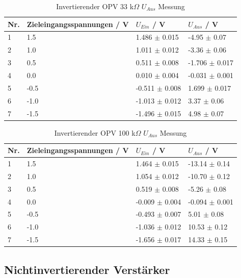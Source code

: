 \documentclass[12pt,a4paper,twoside]{article}
\begin{document}
\begin{table}[H]
    \centering
    \caption{Invertierender OPV 33 k$\Omega$ $U_{Aus}$ Messung}
    \label{tab:IoVerstärkungenGemessen33}
    \begin{tabular}{| l | l | l | l |}
        \hline
        Nr. & Zieleingangsspannungen / V & $U_{Ein}$ / V & $U_{Aus}$ / V \\
        \hline
        1 &  1.5 &  1.486 $\pm$ 0.015 & -4.95  $\pm$  0.07 \\
        2 &  1.0 &  1.011 $\pm$ 0.012 & -3.36  $\pm$  0.06 \\
        3 &  0.5 &  0.511 $\pm$ 0.008 & -1.706 $\pm$ 0.017 \\
        4 &  0.0 &  0.010 $\pm$ 0.004 & -0.031 $\pm$ 0.001 \\
        5 & -0.5 & -0.511 $\pm$ 0.008 &  1.699 $\pm$ 0.017 \\
        6 & -1.0 & -1.013 $\pm$ 0.012 &  3.37 $\pm$ 0.06  \\
        7 & -1.5 & -1.496 $\pm$ 0.015 &  4.98 $\pm$ 0.07  \\
        \hline
    \end{tabular}
\end{table}

\begin{table}[H]
    \centering
    \caption{Invertierender OPV 100 k$\Omega$ $U_{Aus}$ Messung}
    \label{tab:IoVerstärkungenGemessen100}
    \begin{tabular}{| l | l | l | l |}
        \hline
        Nr. & Zieleingangsspannungen / V & $U_{Ein}$ / V & $U_{Aus}$ / V \\
        \hline
        1 &  1.5 &  1.464 $\pm$ 0.015 & -13.14  $\pm$ 0.14  \\
        2 &  1.0 &  1.054 $\pm$ 0.012 & -10.70  $\pm$ 0.12  \\
        3 &  0.5 &  0.519 $\pm$ 0.008 &  -5.26  $\pm$ 0.08  \\
        4 &  0.0 & -0.009 $\pm$ 0.004 &  -0.094 $\pm$ 0.001 \\
        5 & -0.5 & -0.493 $\pm$ 0.007 &   5.01  $\pm$ 0.08  \\
        6 & -1.0 & -1.036 $\pm$ 0.012 &  10.53  $\pm$ 0.12  \\
        7 & -1.5 & -1.656 $\pm$ 0.017 &  14.33  $\pm$ 0.15  \\
        \hline
    \end{tabular}
\end{table}


\subsection{Nichtinvertierender Verstärker}
\end{document}
